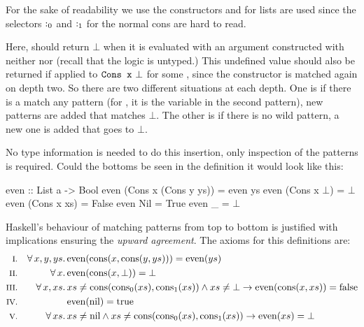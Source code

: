 \noindent
For the sake of readability we use the constructors  and
 for lists are used since the selectors $\mathrm{:_0}$ and
$\mathrm{:_1}$ for the normal cons are hard to read.

Here,  should return $\bot$ when it is evaluated with an
argument constructed with neither  nor  (recall that
the logic is untyped.) This undefined value should also be returned if
applied to $\texttt{Cons x\,\,}\bot$ for some , since the 
constructor is matched again on depth two. So there are two different
situations at each depth. One is if there is a match any pattern (for
, it is the variable  in the second pattern), new
patterns are added that matches $\bot$. The other is if there is no
wild pattern, a new one is added that goes to $\bot$.

\begin{comment}
First, it needs to be determined if there is a match-anything branch or not.
For \hs{even} above, there is no match anything case, so a new one is added
that matches anything that is not

For each matched constructor, we need to add a new match to bottom,
which evaluates to bottom. Unnecessary bottoms can be carelessly added
since overlapping patterns are removed \emph{afterwards}. Furthermore,
a wild pattern is added at the end that goes to bottom in case there
are other constructors for the data type not mentioned in the
patterns.
\end{comment}


\pagebreak
No type information is needed to do this insertion, only inspection of
the patterns is required. Could the bottoms be seen in the definition
it would look like this:

\begin{code}[mathescape]
even :: List a -> Bool
even (Cons x (Cons y ys)) = even ys
even (Cons x $\bot$)            = $\bot$
even (Cons x xs)          = False
even Nil                  = True
even _                    = $\bot$
\end{code}

Haskell's behaviour of matching patterns from top to bottom is
justified with implications ensuring the \emph{upward agreement}. The
axioms for this definitions are:
\newcommand\uncons[1]{\cons{\fn{cons_0}(#1)}{\fn{cons_1}(#1)}}
\newcommand\even[1]{\fn{even}(#1)}
\newcommand\cons[2]{\fn{cons}(#1,#2)}
\begin{align*}
\rom{1} && \faaa{x}{y}{ys} & \even{\cons{x}{\cons{y}{ys}}} = \even{ys} \\
\rom{2} && \fa{x}          & \even{\cons{x}{\bot}}         = \bot      \\
\rom{3} && \faa{x}{xs}     & xs \neq \uncons{xs} \wedge xs \neq \bot \rightarrow \even{\cons{x}{xs}} = \fn{false}  \\
\rom{4} &&                 & \even{\fn{nil}} = \fn{true} \\
\rom{5} && \fa{xs}         & xs \neq \fn{nil} \wedge
                             xs \neq \uncons{xs}
                             \rightarrow \even{xs} = \bot
\end{align*}

